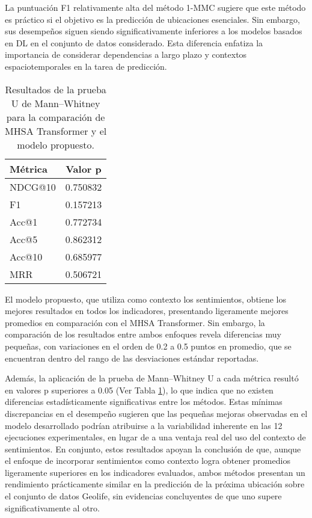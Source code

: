 La puntuaci\'on F1 relativamente alta del 
m\'etodo 1-MMC sugiere que este m\'etodo es pr\'actico si el objetivo es 
la predicci\'on de ubicaciones esenciales. Sin embargo, sus 
desempe\~nos siguen siendo significativamente inferiores a los modelos 
basados en DL en el conjunto de datos considerado. Esta diferencia 
enfatiza la importancia de considerar dependencias a largo plazo y 
contextos espaciotemporales en la tarea de predicci\'on.

\begin{table}[h]
    \centering
    \caption{Resultados de la prueba U de Mann–Whitney para la comparación de MHSA Transformer y el modelo propuesto.}
    \label{tab:3}
    \begin{tabular}{lc}
        \toprule
        Métrica & Valor p \\
        \midrule
        NDCG@10 & 0.750832 \\
        F1      & 0.157213 \\
        Acc@1   & 0.772734 \\
        Acc@5   & 0.862312 \\
        Acc@10  & 0.685977 \\
        MRR     & 0.506721 \\
        \bottomrule
    \end{tabular}
\end{table}
\newpage
El modelo propuesto, que utiliza como contexto los 
sentimientos, obtiene los mejores resultados en todos los 
indicadores, presentando ligeramente mejores promedios en 
comparación con el MHSA Transformer. Sin embargo, 
la comparación de los resultados entre ambos enfoques 
revela diferencias muy pequeñas, con variaciones en el 
orden de 0.2 a 0.5 puntos en promedio, que se encuentran 
dentro del rango de las desviaciones estándar reportadas. 

Además, la aplicación de la prueba de Mann–Whitney U a 
cada métrica resultó en valores p superiores a 0.05 (Ver Tabla \ref{tab:3}), lo que indica que no 
existen diferencias estadísticamente significativas entre 
los métodos. Estas mínimas discrepancias en el desempeño 
sugieren que las pequeñas mejoras observadas en el modelo 
desarrollado podrían atribuirse a la variabilidad inherente en 
las 12 ejecuciones experimentales, en lugar de a una 
ventaja real del uso del contexto de sentimientos. 
En conjunto, estos resultados apoyan la conclusión de que, 
aunque el enfoque de incorporar sentimientos como contexto 
logra obtener promedios ligeramente superiores en los 
indicadores evaluados, ambos métodos presentan un 
rendimiento prácticamente similar en la predicción de 
la próxima ubicación sobre el conjunto de datos Geolife, 
sin evidencias concluyentes de que uno supere 
significativamente al otro.

